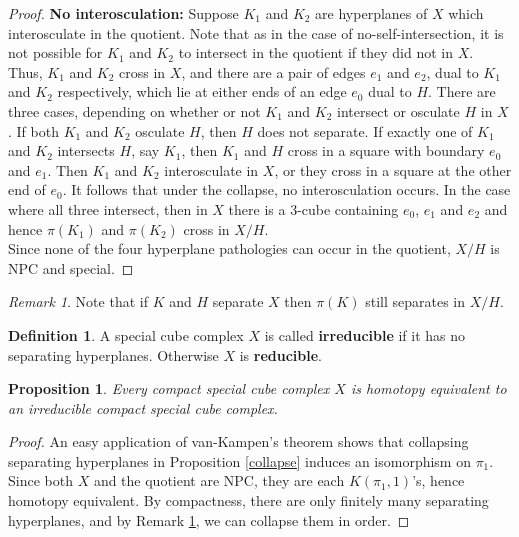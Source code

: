 \documentclass[11pt]{amsart}
\numberwithin{thm}{section}
\newtheorem{proposition}[thm]{Proposition}
\theoremstyle{remark}
\newtheorem{rmk}[thm]{Remark}
\theoremstyle{definition}
\newtheorem{definition}[thm]{Definition}
\begin{document}
\begin{proof}
\noindent
\textbf{No interosculation:} Suppose $K_1$ and $K_2$ are hyperplanes of $X$ which interosculate in the quotient.  Note that as in the case of no-self-intersection, it is not possible for $K_1$ and $K_2$ to intersect in the quotient if they did not in $X$.  Thus, $K_1$ and $K_2$ cross in $X$, and there are a pair of edges $e_1$ and $e_2$, dual to $K_1$ and $K_2$ respectively, which lie at either ends of an edge $e_0$ dual to $H$.   There are three cases, depending on whether or not $K_1$ and $K_2$  intersect or osculate $H$ in $X$.  If both $K_1$ and $K_2$ osculate $H$, then $H$ does not separate.  If exactly one of $K_1$ and $K_2$ intersects $H$, say $K_1$, then $K_1$ and $H$ cross in a square with boundary $e_0$ and $e_1$.  Then $K_1$ and $K_2$ interosculate in $X$, or they cross in a square at the other end of $e_0$.  It follows that under the collapse, no interosculation occurs.  In the case where all three intersect, then in $X$ there is a 3-cube containing $e_0$, $e_1$ and $e_2$ and hence $\pi(K_1)$ and $\pi(K_2)$ cross in $X/H$.\\

\noindent
Since none of the four hyperplane pathologies can occur in the quotient, $X/H$ is NPC and special.  
\end{proof}

\begin{rmk}\label{StillSep} Note that if $K$ and $H$ separate $X$ then $\pi(K)$ still separates in $X/H$.
\end{rmk}

\begin{definition} A special cube complex $X$ is called \textbf{irreducible} if it has no separating hyperplanes.  Otherwise $X$ is \textbf{reducible}.  

\end{definition}

\begin{proposition} \label{Irreducible}Every compact special cube complex $X$ is homotopy equivalent to an irreducible compact special cube complex.   
\end{proposition}
\begin{proof} 
An easy application of van-Kampen's theorem shows that collapsing separating hyperplanes in Proposition \ref{collapse} induces an isomorphism on $\pi_1$.  Since both $X$ and the quotient are NPC, they are each $K(\pi_1,1)$'s, hence homotopy equivalent. By compactness, there are only finitely many separating hyperplanes, and by Remark \ref{StillSep}, we can collapse them in order.  
\end{proof}
\end{document}
